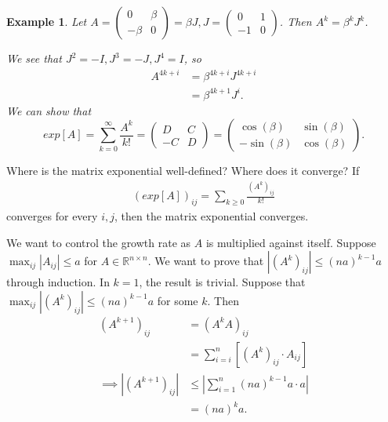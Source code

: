 \documentclass{tufte-handout}
\newcommand*\R{\mathbb{R}}
\newtheorem{ex}[thm]{Example}
\theoremstyle{definition}
\begin{document}
\begin{ex}
	Let $A = \begin{pmatrix}
		0 & \beta \\
		-\beta & 0
	\end{pmatrix} = \beta J, J = \begin{pmatrix}
	0 & 1 \\
	-1 & 0
	\end{pmatrix}$.
	Then $A^k = \beta^k J^k$. 

	We see that $J^2 = -I, J^3 = -J, J^{4} = I$, so
	\begin{align*}
		A^{4k+i} &= \beta^{4k+i} J^{4k+i} \\
		&= \beta^{4k + 1} J^{i}
	.\end{align*}
	We can show that \[
		exp[A] = \sum\limits_{k=0}^{\infty} \frac{A^{k}}{k!} = \begin{pmatrix}
		D & C \\
		-C & D
		\end{pmatrix} = \begin{pmatrix}
		\cos{(\beta)} & \sin{(\beta)} \\
		-\sin{(\beta)} & \cos{(\beta)}
		\end{pmatrix} 
	.\] 
\end{ex}

Where is the matrix exponential well-defined? Where does it converge? If
\begin{align*}
	\left( exp[A] \right)_{ij} = \sum\limits_{k \ge 0}^{} \frac{\left( A^k \right)_{ij}}{k!}
\end{align*}
converges for every $i,j$, then the matrix exponential converges.

We want to control the growth rate as $A$ is multiplied against itself. Suppose $\max_{ij} \left| A_{ij} \right| \le a$ for $A \in \R^{n \times n}$. We want to prove that $\left|(A^{k})_{ij}\right| \le \left( na \right)^{k-1}a$ through induction. In $k=1$, the result is trivial. Suppose that $\max_{ij} \left| \left( A^k \right)_{ij} \right| \le (na)^{k-1}a$ for some $k$. Then
\begin{align*}
	\left( A^{k+1} \right)_{ij} &= \left( A^{k} A \right)_{ij} \\
								&= \sum\limits_{i=i}^{n} \left[ \left( A^k \right)_{ij} \cdot A_{ij}	\right] \\
	\implies \left| \left( A^{k+1} \right)_{ij} \right| &\le \left| \sum\limits_{i=1}^{n} (na)^{k-1}a \cdot a \right| \\
														&= (na)^{k} a
.\end{align*} 
\end{document}
